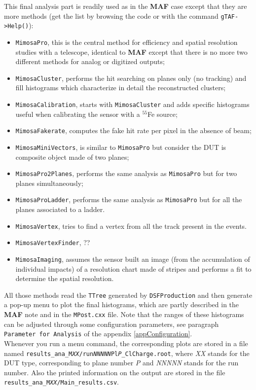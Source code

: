 \documentclass[a4paper, 12pt, twoside]{article}
\newcommand{\MAF}{{\bf MAF }}
\begin{document}
\noindent
This final analysis part is readily used as in the \MAF case except that they are more methods (get the list by browsing the code or with the command {\tt gTAF->Help()}):
\begin{itemize}
\item {\tt MimosaPro}, this is the central method for efficiency and spatial resolution studies with a telescope, identical to \MAF except that there is no more two different methods for analog or digitized outputs;
\item {\tt MimosaCluster}, performs the hit searching on planes only (no tracking) and fill histograms which characterize in detail the reconstructed clusters;
\item {\tt MimosaCalibration}, starts with {\tt MimosaCluster} and adds specific histograms useful when calibrating the sensor with a $^{55}$Fe source;
\item {\tt MimosaFakerate}, computes the fake hit rate per pixel in the absence of beam;
\item {\tt MimosaMiniVectors}, is similar to {\tt MimosaPro} but consider the DUT is composite object made of two planes;
\item {\tt MimosaPro2Planes}, performs the same analysis as {\tt MimosaPro} but for two planes simultaneously;
\item {\tt MimosaProLadder}, performs the same analysis as {\tt MimosaPro} but for all the planes associated to a ladder.
\item {\tt MimosaVertex}, tries to find a vertex from all the track present in the events.
\item {\tt MimosaVertexFinder}, ??
\item {\tt MimosaImaging}, assumes the sensor built an image (from the accumulation of individual impacts) of a resolution chart made of stripes and performs a fit to determine the spatial resolution.
\end{itemize}
All those methods read the {\tt TTree} generated by {\tt DSFProduction} and then generate a pop-up menu to plot the final histograms, which are partly described in the \MAF note and in the {\tt MPost.cxx} file. Note that the ranges of these histograms can be adjusted through some configuration parameters, see paragraph {\tt Parameter for Analysis} of the appendix \ref{appConfiguration}.\\
Whenever you run a menu command, the corresponding plots are stored in a file named {\tt results\_ana\_M{\it{XX}}/run{\it{NNNNN}}Pl{\it{P}}\_ClCharge.root}, where {\it{XX}} stands for the DUT type, corresponding to plane number {\it{P}} and {\it{NNNNN}} stands for the run number. Also the printed information on the output are stored in the file {\tt results\_ana\_M{\it{XX}}/Main\_results.csv}.\\
\end{document}
